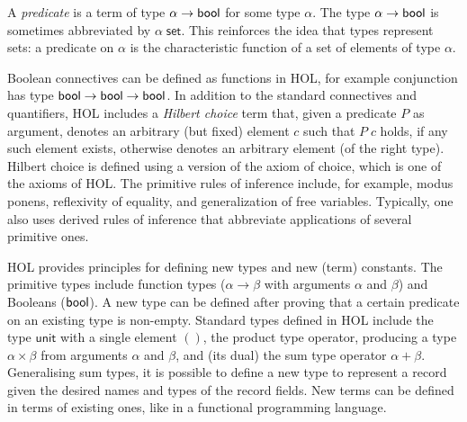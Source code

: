 \documentclass[twoside,titlepage,11pt]{article}
\begin{document}
A \emph{predicate} is a term of type $\alpha\to\mathsf{bool}$ for some type $\alpha$.
The type $\alpha\to\mathsf{bool}$ is sometimes abbreviated by $\alpha\;\mathsf{set}$.
This reinforces the idea that types represent sets: a predicate on $\alpha$ is the characteristic function of a set of elements of type $\alpha$.

Boolean connectives can be defined as functions in HOL, for example conjunction has type $\mathsf{bool}\to\mathsf{bool}\to\mathsf{bool}$.
In addition to the standard connectives and quantifiers, HOL includes a \emph{Hilbert choice} term that, given a predicate $P$ as argument, denotes an arbitrary (but fixed) element $c$ such that $P\; c$ holds, if any such element exists, otherwise denotes an arbitrary element (of the right type).
Hilbert choice is defined using a version of the axiom of choice, which is one of the axioms of HOL.
The primitive rules of inference include, for example, modus ponens, reflexivity of equality, and generalization of free variables.
Typically, one also uses derived rules of inference that abbreviate applications of several primitive ones.

HOL provides principles for defining new types and new (term) constants.
The primitive types include function types ($\alpha\to\beta$ with arguments $\alpha$ and $\beta$) and Booleans ($\mathsf{bool}$).
A new type can be defined after proving that a certain predicate on an existing type is non-empty.
Standard types defined in HOL include the type $\mathsf{unit}$ with a single element $()$, the product type operator, producing a type $\alpha\times\beta$ from arguments $\alpha$ and $\beta$, and (its dual) the sum type operator $\alpha+\beta$.
Generalising sum types, it is possible to define a new type to represent a record given the desired names and types of the record fields.
New terms can be defined in terms of existing ones, like in a functional programming language.
\end{document}
